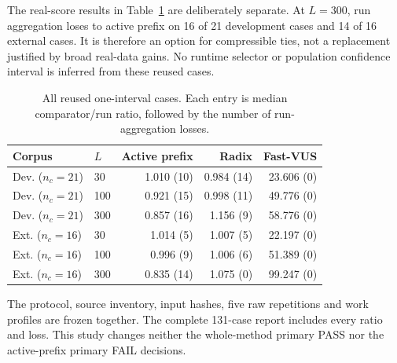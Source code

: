 The real-score results in Table~\ref{tab:tie-real} are deliberately separate.
At $L=300$, run aggregation loses to active prefix on 16 of 21 development
cases and 14 of 16 external cases. It is therefore an option for compressible
ties, not a replacement justified by broad real-data gains. No runtime selector
or population confidence interval is inferred from these reused cases.

\begin{table}[t]
\centering\small
\caption{All reused one-interval cases. Each entry is median comparator/run
ratio, followed by the number of run-aggregation losses.}
\label{tab:tie-real}
\setlength{\tabcolsep}{4pt}
\begin{tabular}{llrrr}
\toprule
Corpus & $L$ & Active prefix & Radix & Fast-VUS\\
\midrule
Dev. ($n_c=21$) & 30 & 1.010 (10) & 0.984 (14) & 23.606 (0) \\
Dev. ($n_c=21$) & 100 & 0.921 (15) & 0.998 (11) & 49.776 (0) \\
Dev. ($n_c=21$) & 300 & 0.857 (16) & 1.156 (9) & 58.776 (0) \\
Ext. ($n_c=16$) & 30 & 1.014 (5) & 1.007 (5) & 22.197 (0) \\
Ext. ($n_c=16$) & 100 & 0.996 (9) & 1.006 (6) & 51.389 (0) \\
Ext. ($n_c=16$) & 300 & 0.835 (14) & 1.075 (0) & 99.247 (0) \\
\bottomrule
\end{tabular}
\end{table}

The protocol, source inventory, input hashes, five raw repetitions and work
profiles are frozen together. The complete 131-case report includes every
ratio and loss. This study changes neither the whole-method primary PASS nor
the active-prefix primary FAIL decisions.
